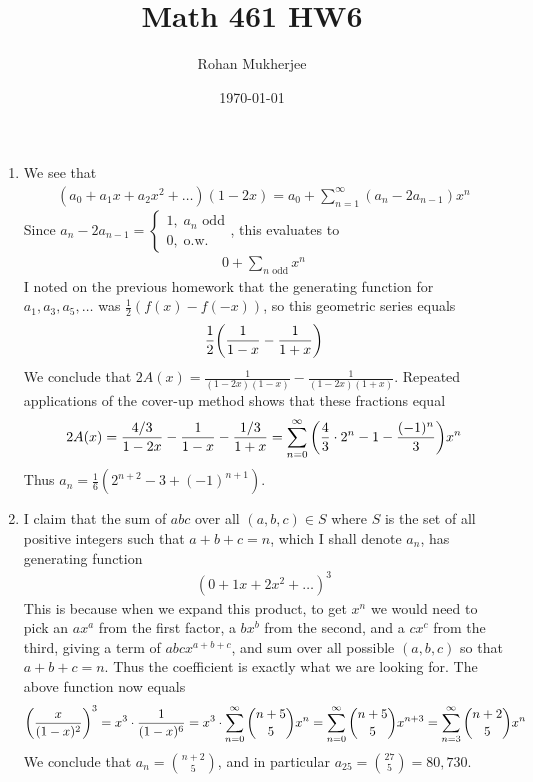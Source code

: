 \documentclass[12pt]{article}
\title{Math 461 HW6}
\date{\today}
\author{Rohan Mukherjee}
\theoremstyle{definitionstyle}
\begin{document}
	\maketitle
	\begin{enumerate}[leftmargin=\labelsep]
		\item We see that
		\begin{align*}
			(a_0+a_1x+a_2x^2+ \ldots)(1-2x) = a_0 + \sum_{n=1}^\infty (a_n-2a_{n-1})x^n
		\end{align*}
		Since $a_n-2a_{n-1} = \begin{cases}
			1, \; a_n \text{ odd} \\
			0, \; \text{o.w.}
		\end{cases}$, this evaluates to
	\begin{align*}
		0 + \sum_{n \text{ odd}} x^n
	\end{align*}
	I noted on the previous homework that the generating function for $a_1, a_3, a_5, \ldots$ was $\frac12 (f(x)-f(-x))$, so this geometric series equals
	\begin{align*}
		\frac12 \qty(\frac{1}{1-x} - \frac{1}{1+x})
	\end{align*}
	We conclude that $2A(x) = \frac{1}{(1-2x)(1-x)} - \frac{1}{(1-2x)(1+x)}$. Repeated applications of the cover-up method shows that these fractions equal
	\begin{align*}
		2A(x) = \frac{4/3}{1-2x} - \frac{1}{1-x} - \frac{1/3}{1+x} = \sum_{n=0}^\infty \qty(\frac43 \cdot 2^n - 1 - \frac{(-1)^n}{3})x^n
	\end{align*}
	Thus $a_n = \frac16(2^{n+2}-3+(-1)^{n+1})$.
	
	\item I claim that the sum of $abc$ over all $(a, b, c) \in S$ where $S$ is the set of all positive integers such that $a+b+c=n$, which I shall denote $a_n$, has generating function
	\begin{align*}
		(0+1x+2x^2+\ldots)^3
	\end{align*}
	This is because when we expand this product, to get $x^n$ we would need to pick an $ax^a$ from the first factor, a $bx^b$ from the second, and a $cx^c$ from the third, giving a term of $abcx^{a+b+c}$, and sum over all possible $(a,b,c)$ so that $a+b+c=n$. Thus the coefficient is exactly what we are looking for. The above function now equals
	\begin{align*}
		\qty(\frac{x}{(1-x)^2})^3 = x^3 \cdot \frac{1}{(1-x)^6} = x^3 \cdot \sum_{n=0}^\infty {n+5 \choose 5} x^n = \sum_{n=0}^\infty {n +5 \choose 5} x^{n+3} = \sum_{n=3}^\infty {n+2 \choose 5}x^n
	\end{align*}
	We conclude that $a_n = {n+2 \choose 5}$, and in particular $a_{25} = {27 \choose 5} = 80,730$.
	

\end{enumerate}
\end{document}
